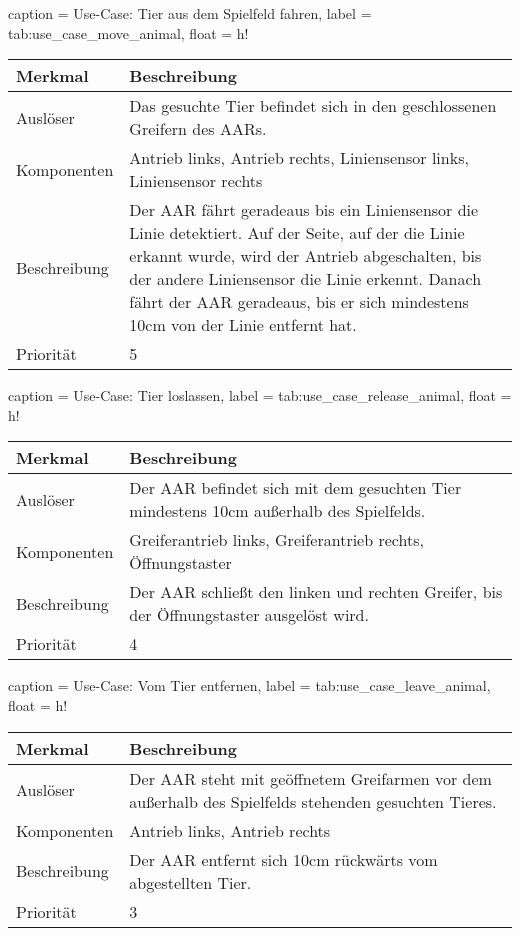 \begin{dhbwtable}{%
    caption	= Use-Case: Tier aus dem Spielfeld fahren,
    label	= tab:use_case_move_animal,
    float   = h!
}
    \begin{tabularx}{\textwidth}{lX}
        \toprule
        \textbf{Merkmal}     & \textbf{Beschreibung}  \\\midrule
        Auslöser     & Das gesuchte Tier befindet sich in den geschlossenen Greifern des \acp{AAR}.\\
        Komponenten  & Antrieb links, Antrieb rechts, Liniensensor links, Liniensensor rechts\\
        Beschreibung & Der \ac{AAR} fährt geradeaus bis ein Liniensensor die Linie detektiert. Auf der Seite, auf der die Linie erkannt wurde, wird der Antrieb abgeschalten, bis der andere Liniensensor die Linie erkennt. Danach fährt der \ac{AAR} geradeaus, bis er sich mindestens 10cm von der Linie entfernt hat.\\
        Priorität    & 5 \\\bottomrule
    \end{tabularx}    
\end{dhbwtable}

\begin{dhbwtable}{%
    caption	= Use-Case: Tier loslassen,
    label	= tab:use_case_release_animal,
    float   = h!
}
    \begin{tabularx}{\textwidth}{lX}
        \toprule
        \textbf{Merkmal}     & \textbf{Beschreibung}  \\\midrule
        Auslöser     & Der \ac{AAR} befindet sich mit dem gesuchten Tier mindestens 10cm außerhalb des Spielfelds.\\
        Komponenten  & Greiferantrieb links, Greiferantrieb rechts, Öffnungstaster\\
        Beschreibung & Der \ac{AAR} schließt den linken und rechten Greifer, bis der Öffnungstaster ausgelöst wird.\\
        Priorität    & 4 \\\bottomrule
    \end{tabularx}    
\end{dhbwtable}

\begin{dhbwtable}{%
    caption	= Use-Case: Vom Tier entfernen,
    label	= tab:use_case_leave_animal,
    float   = h!
}
    \begin{tabularx}{\textwidth}{lX}
        \toprule
        \textbf{Merkmal}     & \textbf{Beschreibung}  \\\midrule
        Auslöser     & Der \ac{AAR} steht mit geöffnetem Greifarmen vor dem außerhalb des Spielfelds stehenden gesuchten Tieres.\\
        Komponenten  & Antrieb links, Antrieb rechts\\
        Beschreibung & Der \ac{AAR} entfernt sich 10cm rückwärts vom abgestellten Tier.\\
        Priorität    & 3 \\\bottomrule
    \end{tabularx}    
\end{dhbwtable}